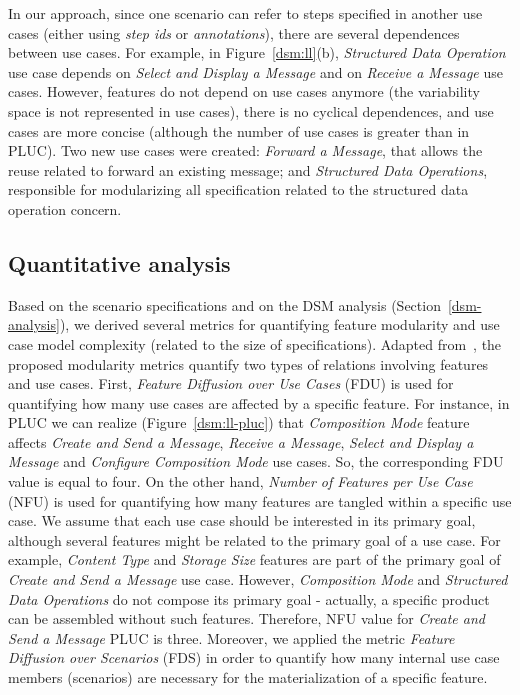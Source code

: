 \documentclass{acm_proc_article-sp}
\begin{document}
In our approach, since one scenario can refer to steps specified in
another use cases (either using \emph{step ids} or \emph{annotations}), there are several 
dependences between use
cases. For example, in Figure~\ref{dsm:ll}(b), \emph{Structured Data Operation} 
use case depends on \emph{Select and Display a Message} and on \emph{Receive a Message} use cases. 
However, features do not depend on use cases anymore (the variability space is not represented in use
cases), there is no cyclical dependences, and use cases are more concise (although the number
of use cases is greater than in PLUC). Two new use cases were created: \emph{Forward a Message}, that allows the reuse related 
to forward an existing message; and \emph{Structured Data
Operations}, responsible for modularizing all specification related to the structured data operation
concern.



\subsection{Quantitative analysis}
\label{quantitative-analysis}

Based on the scenario specifications 
and on the DSM analysis (Section~\ref{dsm-analysis}), we derived several metrics for quantifying 
feature modularity and use case model complexity (related to the size of specifications). 
Adapted from~\cite{greenwood-ecoop-2007}, the proposed modularity metrics quantify two types of 
relations involving features and use cases. First, \emph{Feature Diffusion over Use Cases} (FDU)
is used for quantifying how many use cases are affected by a specific feature. For instance, in PLUC we 
can realize (Figure~\ref{dsm:ll-pluc}) that \emph{Composition Mode} feature affects \emph{Create and Send a Message}, 
\emph{Receive a Message}, \emph{Select and Display a Message} and \emph{Configure Composition Mode} use cases. So, the 
corresponding FDU value is equal to four. On the other hand, \emph{Number of Features per Use Case} (NFU)
is used for quantifying how many features are tangled within a specific use case. We assume that each use 
case should be interested in its primary goal, although several features might be related to the primary goal of a use case.
For example, \emph{Content Type} and \emph{Storage Size} features are part of the primary goal of \emph{Create and Send a
Message} use case. However, \emph{Composition Mode} and \emph{Structured Data Operations} do not compose
its primary goal - actually, a specific product can be assembled without such features. 
Therefore, NFU value for \emph{Create and Send a Message} PLUC is three. Moreover, 
we applied the metric \emph{Feature Diffusion over Scenarios} (FDS) in order 
to quantify how many internal use case members (scenarios) are necessary for the materialization of a specific feature.
\end{document}
